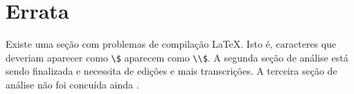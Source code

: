 \chapter*[Introdução]{Errata}


Existe uma seção com problemas de compilação \LaTeX {}. Isto é, caracteres que deveriam aparecer como \verb|\$| aparecem como \verb|\\$|. A segunda seção de análise está sendo finalizada  e necessita de edições e mais transcrições. A terceira seção de análise não foi concuída ainda .